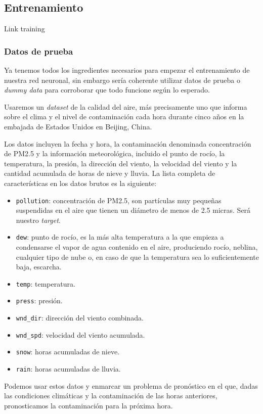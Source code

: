 \documentclass[a4paper,12pt]{article}
\begin{document}
\subsection{Entrenamiento}
Link training
\subsubsection{Datos de prueba}
Ya tenemos todos los ingredientes necesarios para empezar el entrenamiento de nuestra red neuronal, sin embargo sería coherente utilizar datos de prueba o \textit{dummy data} para corroborar que todo funcione según lo esperado.

Usaremos un \textit{dataset} de la calidad del aire, más precisamente uno que informa sobre el clima y el nivel de contaminación cada hora durante cinco años en la embajada de Estados Unidos en Beijing, China.

Los datos incluyen la fecha y hora, la contaminación denominada concentración de PM2.5 y la información meteorológica, incluido el punto de rocío, la temperatura, la presión, la dirección del viento, la velocidad del viento y la cantidad acumulada de horas de nieve y lluvia. La lista completa de características en los datos brutos es la siguiente:

\begin{itemize}
	\item \texttt{pollution}: concentración de PM2.5, son partículas muy pequeñas suspendidas en el aire que tienen un diámetro de menos de 2.5 micras. Será nuestro \textit{target}.
	\item \texttt{dew}: punto de rocío, es la más alta temperatura a la que empieza a condensarse el vapor de agua contenido en el aire, produciendo rocío, neblina, cualquier tipo de nube o, en caso de que la temperatura sea lo suficientemente baja, escarcha.
	\item \texttt{temp}: temperatura.
	\item \texttt{press}: presión.
	\item \texttt{wnd\_dir}: dirección del viento combinada.
	\item \texttt{wnd\_spd}: velocidad del viento acumulada.
	\item \texttt{snow}: horas acumuladas de nieve.
	\item \texttt{rain}: horas acumuladas de lluvia.
\end{itemize}

Podemos usar estos datos y enmarcar un problema de pronóstico en el que, dadas las condiciones climáticas y la contaminación de las horas anteriores, pronosticamos la contaminación para la próxima hora.
\end{document}

